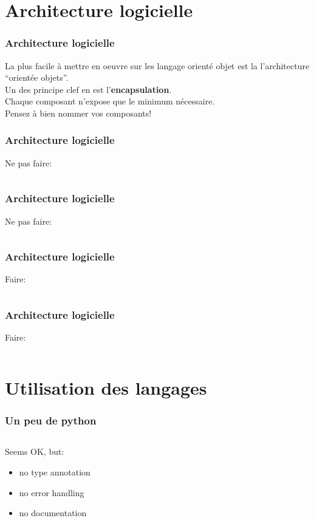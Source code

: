 \documentclass{beamer}
\begin{document}
\section{Architecture logicielle}
\begin{frame}
    \frametitle{Architecture logicielle}

    La plus facile à mettre en oeuvre sur les langage orienté objet est la l'architecture ``orientée objets''.\\

    Un des principe clef en est l'\textbf{encapsulation}.\\

    Chaque composant n'expose que le minimum nécessaire.\\

    Pensez à bien nommer vos composants!



\end{frame}

\begin{frame}
    \frametitle{Architecture logicielle}

    Ne pas faire:\\
    \inputminted{cpp}{../code/cpp/Parent.cpp}

\end{frame}

\begin{frame}
    \frametitle{Architecture logicielle}

    Ne pas faire:\\
    \inputminted{cpp}{../code/cpp/Enfant.cpp}

\end{frame}

\begin{frame}
    \frametitle{Architecture logicielle}

    Faire:\\
    \inputminted{cpp}{../code/cpp/Parent_ok.cpp}

\end{frame}

\begin{frame}
    \frametitle{Architecture logicielle}

    Faire:\\
    \inputminted{cpp}{../code/cpp/Enfant_ok.cpp}

\end{frame}

\section{Utilisation des langages}
\begin{frame}
    \frametitle{Un peu de python}
    \inputminted{python}{../code/python/intro/intro.py}
    Seems OK, but:
    \begin{itemize}
        \item no type annotation
        \item no error handling
        \item no documentation
    \end{itemize}
\end{frame}
\end{document}
